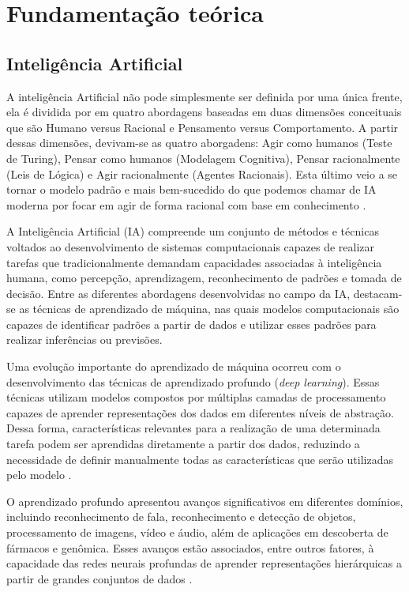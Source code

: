 \chapter{Fundamentação teórica}
\label{cap:fundamentacao}

\section{Inteligência Artificial}
A inteligência Artificial não pode simplesmente ser definida por uma única frente, ela é dividida por  em quatro abordagens baseadas em duas dimensões conceituais que são Humano versus Racional e Pensamento versus Comportamento.
A partir dessas dimensões, devivam-se as quatro aborgadens: Agir como humanos (Teste de Turing),
Pensar como humanos (Modelagem Cognitiva),
Pensar racionalmente (Leis de Lógica) e
Agir racionalmente (Agentes Racionais). Esta último veio a se tornar o modelo padrão e mais bem-sucedido do que podemos chamar de IA moderna por focar em agir de forma racional com base em conhecimento \cite[p. 22]{russell2021artificial}.

A Inteligência Artificial (IA) compreende um conjunto de métodos e técnicas
voltados ao desenvolvimento de sistemas computacionais capazes de realizar
tarefas que tradicionalmente demandam capacidades associadas à inteligência
humana, como percepção, aprendizagem, reconhecimento de padrões e tomada de
decisão. Entre as diferentes abordagens desenvolvidas no campo da IA,
destacam-se as técnicas de aprendizado de máquina, nas quais modelos
computacionais são capazes de identificar padrões a partir de dados e utilizar
esses padrões para realizar inferências ou previsões.

Uma evolução importante do aprendizado de máquina ocorreu com o
desenvolvimento das técnicas de aprendizado profundo (\textit{deep learning}).
Essas técnicas utilizam modelos compostos por múltiplas camadas de
processamento capazes de aprender representações dos dados em diferentes
níveis de abstração. Dessa forma, características relevantes para a realização
de uma determinada tarefa podem ser aprendidas diretamente a partir dos dados,
reduzindo a necessidade de definir manualmente todas as características que
serão utilizadas pelo modelo \cite{lecun2015deep}.

O aprendizado profundo apresentou avanços significativos em diferentes
domínios, incluindo reconhecimento de fala, reconhecimento e detecção de
objetos, processamento de imagens, vídeo e áudio, além de aplicações em
descoberta de fármacos e genômica. Esses avanços estão associados, entre outros
fatores, à capacidade das redes neurais profundas de aprender representações
hierárquicas a partir de grandes conjuntos de dados
\cite{lecun2015deep}.

